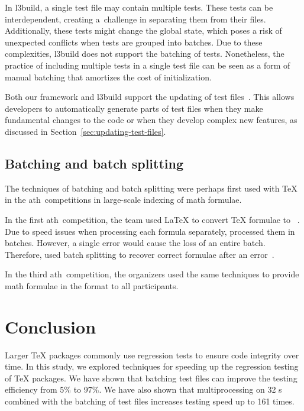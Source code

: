 \documentclass[final]{ltugboat}
\def\ARQMath{\acro{ARQM}ath}
\begin{document}
In l3build, a single test file may contain multiple tests. These tests can be interdependent, creating a~challenge in separating them from their files. Additionally, these tests might change the global state, which poses a risk of unexpected conflicts when tests are grouped into batches. Due to these complexities, l3build does not support the batching of tests. Nonetheless, the practice of including multiple tests in a single test file can be seen as a form of manual batching that amortizes the cost of initialization.

Both our framework and l3build support the updating of test files~\cite[Section~2.7]{latex2023l3build}. This allows developers to automatically generate parts of test files when they make fundamental changes to the code or when they develop complex new features, as discussed in Section~\ref{sec:updating-test-files}.

\subsection{Batching and batch splitting}
The techniques of batching and batch splitting were perhaps first used with \TeX{} in the \ARQMath\ competitions in large-scale indexing of math formulae.

In the first \ARQMath\ competition, the  team used \LaTeX{} to convert \TeX{} formulae to ~\cite[Section~2.2]{novotny2020three}. Due to speed issues when processing each formula separately,  processed them in batches. However, a single error would cause the loss of an entire batch. Therefore,  used batch splitting to recover correct formulae after an error~\cite{novotny2020arqmath}.

In the third \ARQMath\ competition, the organizers used the same techniques to provide math formulae in the  format to all participants.

\section{Conclusion}
\label{sec:conclusion}

Larger \TeX{} packages commonly use regression tests to ensure code integrity over time.
In this study, we explored techniques for speeding up the regression testing of \TeX{} packages. We have shown that batching test files can improve the testing efficiency from 5\% to 97\%. We have also shown that multiprocessing on 32 s combined with the batching of test files increases testing speed up to 161 times.
\end{document}
